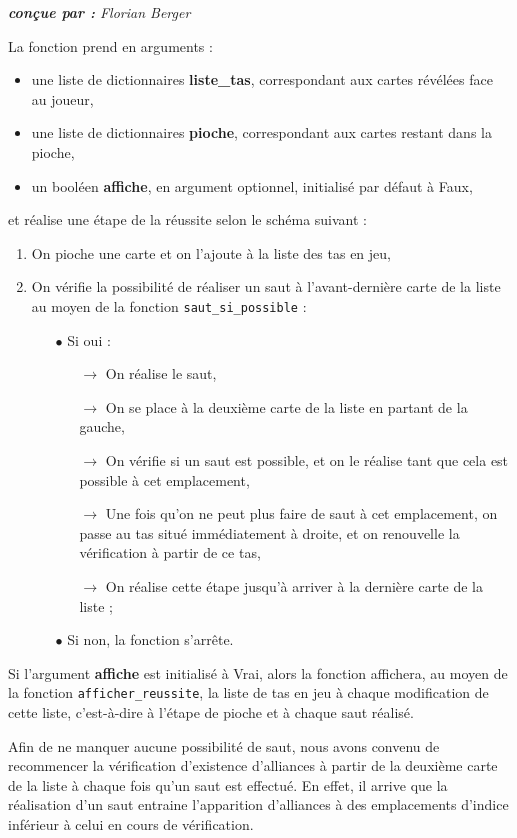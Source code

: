 \documentclass[titlepage]{article}
\begin{document}
\emph{\textbf{conçue par : } Florian Berger} \vspace{2mm}\par
La fonction prend en arguments :
	\begin{itemize}
	\item une liste de dictionnaires \textbf{liste\_tas}, correspondant aux cartes révélées face au joueur,
	\item une liste de dictionnaires \textbf{pioche}, correspondant aux cartes restant dans la pioche,
	\item un booléen \textbf{affiche}, en argument optionnel, initialisé par défaut à Faux,
	\end{itemize}
	\par
et réalise une étape de la réussite selon le schéma suivant :
	\begin{enumerate}
	\item On pioche une carte et on l'ajoute à la liste des tas en jeu,
	\item On vérifie la possibilité de réaliser un saut à l'avant-dernière carte de la liste au moyen de la fonction \texttt{saut\_si\_possible} :
		\begin{itemize}
		\item[$\bullet$] Si oui :
			\begin{itemize}
			\item[$\rightarrow$] On réalise le saut, 
			\item[$\rightarrow$] On se place à la deuxième carte de la liste en partant de la gauche, 
			\item[$\rightarrow$] On vérifie si un saut est possible, et on le réalise tant que cela est possible à cet emplacement,
			\item[$\rightarrow$] Une fois qu'on ne peut plus faire de saut à cet emplacement, on passe au tas situé immédiatement à droite, et on renouvelle la vérification à partir de ce tas,
			\item[$\rightarrow$] On réalise cette étape jusqu'à arriver à la dernière carte de la liste ;
			 \end{itemize}
		\item[$\bullet$] Si non, la fonction s'arrête.
		\end{itemize}
	\end{enumerate}
\par
Si l'argument \textbf{affiche} est initialisé à Vrai, alors la fonction affichera, au moyen de la fonction \texttt{afficher\_reussite}, la liste de tas en jeu à chaque modification de cette liste, c'est-à-dire à l'étape de pioche et à chaque saut réalisé.\par
Afin de ne manquer aucune possibilité de saut, nous avons convenu de recommencer la vérification d'existence d'alliances à partir de la deuxième carte de la liste à chaque fois qu'un saut est effectué. En effet, il arrive que la réalisation d'un saut entraine l'apparition d'alliances à des emplacements d'indice inférieur à celui en cours de vérification. 
\end{document}
